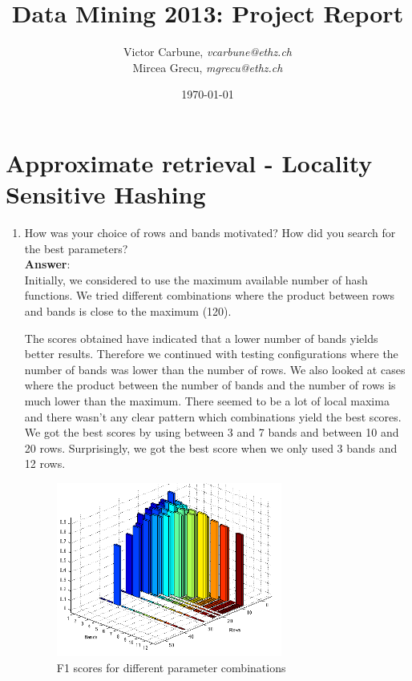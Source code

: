 \documentclass[11pt]{article}
\title{Data Mining 2013: Project Report}
\author{Victor Carbune, \emph{vcarbune@ethz.ch}\\ Mircea Grecu, \emph{mgrecu@ethz.ch} }
\date{\today}
\begin{document}
\maketitle

\section{Approximate retrieval - Locality Sensitive Hashing}
\begin{enumerate}
\item How was your choice of rows and bands motivated? How did you search for the
best parameters? \\

\textbf{Answer}: \\
Initially, we considered to use the maximum available number of
hash functions. We tried different combinations where the product 
between rows and bands is close to the maximum (120).

The scores obtained have indicated that a lower number of bands yields
better results. Therefore we continued with testing configurations where 
the number of bands was lower than the number of rows. 
We also looked at cases where the product between the number of bands and
the number of rows is much lower than the maximum. 
There seemed to be a lot of local maxima and there wasn't any clear pattern 
which combinations yield the best scores. We got the best scores by using
between 3 and 7 bands and between 10 and 20 rows.
Surprisingly, we got the best score when we only used 3 bands and 12 rows.


\begin{figure}[h!b]
\centering
\includegraphics[width=0.7\textwidth]{lsh.png}
\caption{F1 scores for different parameter combinations}
\label{fig:lsh_chart}
\end{figure}



\end{enumerate}
\end{document}
